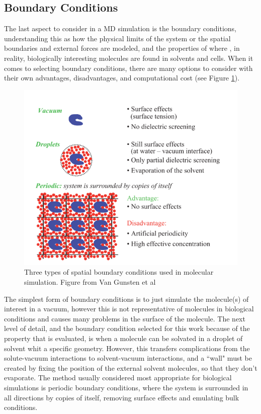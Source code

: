 \subsection{Boundary Conditions}
The last aspect to consider in a MD simulation is the boundary conditions, understanding this as how the physical limits of the system or the spatial boundaries and external forces are modeled, and the properties of where , in reality, biologically interesting molecules are found in solvents and cells. When it comes to selecting boundary conditions, there are many options to consider with their own advantages, disadvantages, and computational cost (see Figure \ref{fig:boundary_conditions}). 
\begin{figure}[h]
    \centering
    \includegraphics[scale=0.5]{Figures/Chapter2/Boundary_conditions.png}
    \caption{Three types of spatial boundary conditions used in molecular
simulation. Figure from Van Gunsten et al \cite{van2006biomolecular}}
    \label{fig:boundary_conditions}
\end{figure}
The simplest form of boundary conditions is to just simulate the molecule(s) of interest in a vacuum, however this is not representative of molecules in biological conditions and causes many problems in the surface of the molecule.
The next level of detail, and the boundary condition selected for this work because of the property that is evaluated, is when a molecule can be solvated in a droplet of solvent whit a specific geometry. However, this transfers complications from the solute-vacuum interactions to solvent-vacuum interactions, and a ``wall" must be created by fixing the position of the external solvent molecules, so that they don’t evaporate.
The method usually considered most appropriate for biological simulations is periodic boundary conditions, where the system is surrounded in all directions by copies of itself, removing surface effects and emulating bulk conditions. 